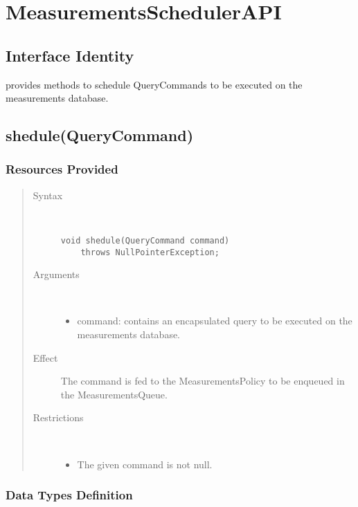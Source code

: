 \section{MeasurementsSchedulerAPI}
\label{api:measurements-scheduler-api}

\subsection{Interface Identity}

\npar {} provides methods to schedule
QueryCommands to be executed on the measurements database.

\subsection{shedule(QueryCommand)}

\subsubsection{Resources Provided}

\begin{quote}
	\begin{description}
		\item[Syntax] \ 
		\begin{verbatim}
void shedule(QueryCommand command)
    throws NullPointerException;
		\end{verbatim}
		\item[Arguments] \
		\begin{itemize}
			\item command: contains an encapsulated query to be executed on the
			measurements database.
		\end{itemize}
		\item[Effect] The command is fed to the MeasurementsPolicy to be enqueued in
		the MeasurementsQueue.
		\item[Restrictions] \ 
		\begin{itemize}
			\item The given command is not null.
		\end{itemize}
	\end{description} 
\end{quote}

\subsubsection{Data Types Definition}


